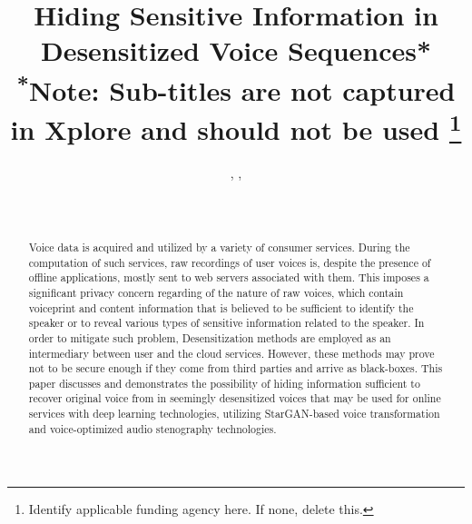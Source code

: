 \documentclass[journal]{IEEEtran} %
\begin{document}
\title{Hiding Sensitive Information in Desensitized Voice Sequences*\\
{\footnotesize \textsuperscript{*}Note: Sub-titles are not captured in Xplore and should not be used}
\thanks{Identify applicable funding agency here. If none, delete this.}
}

\author{%
    , %
    , %
    \\%
    \\%
    \\%
}

\maketitle

\begin{abstract}
Voice data is acquired and utilized by a variety of consumer services. During the computation of such services, raw recordings of user voices is, despite the presence of offline applications, mostly sent to web servers associated with them. This imposes a significant privacy concern regarding of the nature of raw voices, which contain voiceprint and content information that is believed to be sufficient to identify the speaker or to reveal various types of sensitive information related to the speaker. In order to mitigate such problem, Desensitization methods are employed as an intermediary between user and the cloud services. However, these methods may prove not to be secure enough if they come from third parties and arrive as black-boxes. This paper discusses and demonstrates the possibility of hiding information sufficient to recover original voice from in seemingly desensitized voices that may be used for online services with deep learning technologies, utilizing StarGAN-based voice transformation and voice-optimized audio stenography technologies.
\end{abstract}
\end{document}

